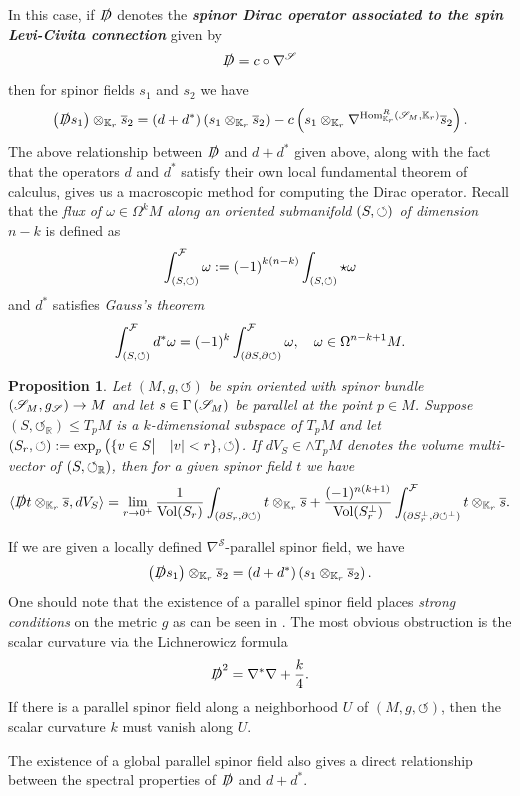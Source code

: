 \documentclass[openany, 11pt]{article}
\newtheorem{proposition}[theorem]{Proposition}
\theoremstyle{definition}
\theoremstyle{remark}
\def\la{\ensuremath{\langle}}
\def\ra{\ensuremath{\rangle}}
\def\lp{\ensuremath{\left(}}
\def\rp{\ensuremath{\right)}}
\def\F{\ensuremath{\mathcal{F}}}
\def\Sc{\ensuremath{\mathscr{S}}}
\def\cal{\ensuremath{\boldsymbol{\circlearrowleft}}}
\def\bR{\ensuremath{\mathbb{R}}}
\def\bK{\ensuremath{\mathbb{K}}}
\def\Hom{\ensuremath{\textnormal{Hom}}}
\begin{document}
In this case, if $\slashed{D}$ denotes the \textbf{\emph{spinor Dirac operator associated to the spin Levi-Civita connection}} given by
\[
    \slashed{D}=c\circ\nabla^{\Sc}
\]
then for spinor fields $s_1$ and $s_2$ we have
\[
    \lp\slashed{D}s_1\rp\otimes_{\bK_r}\overline{s}_2=\lp d+d^*\rp\lp s_1\otimes_{\bK_r}\overline{s}_2\rp-c\lp s_1\otimes_{\bK_r}\nabla^{\Hom^R_{\bK_r}\lp\Sc_M,\bK_r\rp}\overline{s}_2\rp.
\]
The above relationship between $\slashed{D}$ and $d+d^*$ given above, along with the fact that the operators $d$ and $d^*$ satisfy their own local fundamental theorem of calculus, gives us a macroscopic method for computing the Dirac operator. Recall that the \emph{flux of $\omega\in\Omega^kM$ along an oriented submanifold $\lp S,\cal\rp$ of dimension $n-k$} is defined as
\[
    \int^{\F}_{\lp S,\cal\rp}\omega:=\lp-1\rp^{k(n-k)}\int_{\lp S,\cal\rp}\star\omega
\]
and $d^*$ satisfies \emph{Gauss's theorem}
\[
    \int^{\F}_{\lp S,\cal\rp}d^*\omega=(-1)^k\int^{\F}_{\lp \partial S,\partial\cal\rp}\omega,\quad\omega\in\Omega^{n-k+1}M.
\]
\begin{proposition}
    Let $(M,g,\cal)$ be spin oriented with spinor bundle $\lp\Sc_M,g_{\Sc}\rp\rightarrow M$ and let $s\in\Gamma\lp\Sc_M\rp$ be parallel at the point $p\in M$. Suppose $(S,\cal_{\bR})\leqslant T_pM$ is a $k$-dimensional subspace of $T_pM$ and let $(S_r,\cal):=\exp_p\lp\{v\in S\big|\quad |v|<r\},\cal\rp$. If $dV_S\in\wedge T_pM$ denotes the volume multi-vector of $\lp S,\cal_{\bR}\rp$, then for a given spinor field $t$ we have
    \[
        \la\slashed{D}t\otimes_{\bK_r}\overline{s},dV_S\ra=\lim_{r\rightarrow 0^+}\frac{1}{\textup{Vol}(S_r)}\int_{\lp\partial S_r,\partial\cal\rp}t\otimes_{\bK_r}\overline{s}+\frac{(-1)^{n(k+1)}}{\textup{Vol}(S^{\perp}_r)}\int^{\F}_{\lp\partial S^{\perp}_r,\partial \cal^{\perp}\rp} t\otimes_{\bK_r}\overline{s}.
    \]
\end{proposition}
If we are given a locally defined $\nabla^{\Sc}$-parallel spinor field, we have
\[
    \lp\slashed{D}s_1\rp\otimes_{\bK_r}\overline{s}_2=\lp d+d^*\rp\lp s_1\otimes_{\bK_r}\overline{s}_2\rp.
\]
One should note that the existence of a parallel spinor field places \emph{strong conditions} on the metric $g$ as can be seen in \cite{Wan}. The most obvious obstruction is the scalar curvature via
the Lichnerowicz formula
\[
    \slashed{D}^2=\nabla^*\nabla+\frac{k}{4}.
\]
If there is a parallel spinor field along a neighborhood $U$ of $(M,g,\cal)$, then the scalar curvature $k$ must vanish along $U$.\par
The existence of a global parallel spinor field also gives a direct relationship between the spectral properties of $\slashed{D}$ and $d+d^*$.
\end{document}
